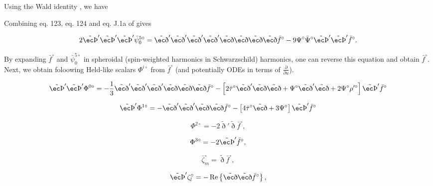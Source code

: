 Using the Wald identity \cite{Wald identity paper}, we have



Combining eq. 123, eq. 124 and eq. J.1a of \cite{Hollands:2024iqp} gives

\begin{equation}
2 \tilde{\thorn}' \tilde{\thorn}' \tilde{\thorn}' \bar{\psi}^{5 \circ}_0 = \tilde{\eth}' \tilde{\eth}' \tilde{\eth}' \tilde{\eth}' \tilde{\eth} \tilde{\eth} \tilde{\eth} \tilde{\eth} \bar{f}^\circ - 9 \Psi^\circ \bar{\Psi}^\circ \tilde{\thorn}' \tilde{\thorn}' \bar{f}^\circ.
\end{equation}

By expanding $\bar{f}^\circ$ and $\bar{\psi}^{5 \circ}_0$ in spheroidal (spin-weighted harmonics in Schwarzschild) harmonics, one can reverse this equation and obtain $\bar{f}^\circ$. Next, we obtain foloowing Held-like scalars $\Phi^{i \circ}$ from $\bar{f}^\circ$ (and potentially ODEs in terms of $\frac{\partial}{\partial u}$).

\begin{equation}
\tilde{\thorn}' \tilde{\thorn}' \Phi^{0 \circ} = - \frac{1}{3} \tilde{\eth}' \tilde{\eth}' \tilde{\eth}' \tilde{\eth} \tilde{\eth} \tilde{\eth} \bar{f}^\circ - \left[ 2 \bar{\tau}^\circ \tilde{\eth}' \tilde{\eth} \tilde{\eth} + \Psi^\circ \tilde{\eth}' \tilde{\eth} + 2 \Psi^\circ \rho^{\prime \circ} \right] \tilde{\thorn}' \bar{f}^\circ
\end{equation}

\begin{equation}
\tilde{\thorn}' \Phi^{1 \circ} = - \tilde{\eth}' \tilde{\eth}' \tilde{\eth} \tilde{\eth} \bar{f}^\circ - \left[ 4 \bar{\tau}^\circ \tilde{\eth} + 3 \Psi^\circ \right] \tilde{\thorn}' \bar{f}^\circ
\end{equation}

\begin{equation}
\Phi^{2 \circ} = -2 \tilde{\eth}' \tilde{\eth} \bar{f}^\circ,
\end{equation}

\begin{equation}
\Phi^{3 \circ} = -2 \tilde{\thorn}' \bar{f}^\circ,
\end{equation}

\begin{equation}
\bar{\zeta}^\circ_m = \tilde{\eth} \bar{f}^\circ,
\end{equation}

\begin{equation}
\tilde{\thorn}' \zeta^\circ_l = - \Re \left\{ \tilde{\eth} \tilde{\eth} \bar{f}^\circ \right\},
\end{equation}

